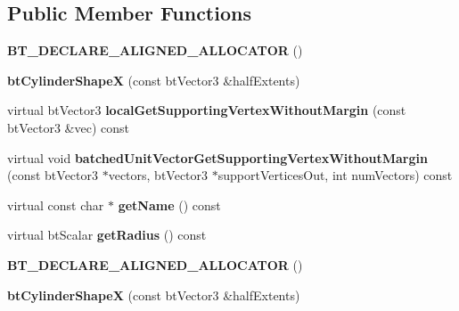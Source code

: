 \subsection*{Public Member Functions}
\begin{DoxyCompactItemize}
\item 
\mbox{\label{classbtCylinderShapeX_a525650ca293449c315eda46c20422245}} 
{\bfseries B\+T\+\_\+\+D\+E\+C\+L\+A\+R\+E\+\_\+\+A\+L\+I\+G\+N\+E\+D\+\_\+\+A\+L\+L\+O\+C\+A\+T\+OR} ()
\item 
\mbox{\label{classbtCylinderShapeX_a174f4e94e9d0424b82c43ea186273c21}} 
{\bfseries bt\+Cylinder\+ShapeX} (const bt\+Vector3 \&half\+Extents)
\item 
\mbox{\label{classbtCylinderShapeX_a4ec04ddc1a0bd16bce9cd431a1e68ab5}} 
virtual bt\+Vector3 {\bfseries local\+Get\+Supporting\+Vertex\+Without\+Margin} (const bt\+Vector3 \&vec) const
\item 
\mbox{\label{classbtCylinderShapeX_a6ed2be22a5633bf7f2d342e63c560ba2}} 
virtual void {\bfseries batched\+Unit\+Vector\+Get\+Supporting\+Vertex\+Without\+Margin} (const bt\+Vector3 $\ast$vectors, bt\+Vector3 $\ast$support\+Vertices\+Out, int num\+Vectors) const
\item 
\mbox{\label{classbtCylinderShapeX_a67b686b5fee1d75fad2edb51b4276693}} 
virtual const char $\ast$ {\bfseries get\+Name} () const
\item 
\mbox{\label{classbtCylinderShapeX_a2c5d11fee8f7f21c9a500b22738b0a13}} 
virtual bt\+Scalar {\bfseries get\+Radius} () const
\item 
\mbox{\label{classbtCylinderShapeX_a525650ca293449c315eda46c20422245}} 
{\bfseries B\+T\+\_\+\+D\+E\+C\+L\+A\+R\+E\+\_\+\+A\+L\+I\+G\+N\+E\+D\+\_\+\+A\+L\+L\+O\+C\+A\+T\+OR} ()
\item 
\mbox{\label{classbtCylinderShapeX_a174f4e94e9d0424b82c43ea186273c21}} 
{\bfseries bt\+Cylinder\+ShapeX} (const bt\+Vector3 \&half\+Extents)
\item 
\mbox{\label{classbtCylinderShapeX_a066ad92f24a0f713d3d96beb83c5f974}} 

\end{DoxyCompactItemize}

